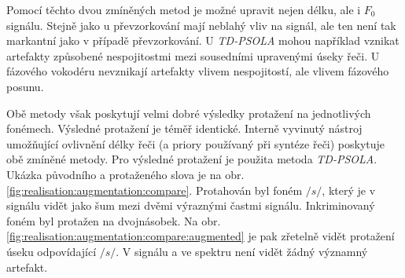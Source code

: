 Pomocí těchto dvou zmíněných metod je možné upravit nejen délku, ale i $F_0$ signálu. Stejně jako u převzorkování mají neblahý vliv na signál, ale ten není tak markantní jako v případě převzorkování. U \textit{TD-PSOLA} mohou například vznikat artefakty způsobené nespojitostmi mezi sousedními upravenými úseky řeči. U fázového vokodéru nevznikají artefakty vlivem nespojitostí, ale vlivem fázového posunu.


Obě metody však poskytují velmi dobré výsledky protažení na jednotlivých fonémech. Výsledné protažení je téměř identické. Interně vyvinutý nástroj umožňující ovlivnění délky řeči (a priory používaný při syntéze řeči) poskytuje obě zmíněné metody. Pro výsledné protažení je použita metoda \textit{TD-PSOLA}. Ukázka původního a protaženého slova  je na obr. \ref{fig:realisation:augmentation:compare}. Protahován byl foném $/s/$, který je v signálu vidět jako šum mezi dvěmi výraznými častmi signálu. Inkriminovaný foném byl protažen na dvojnásobek. Na obr. \ref{fig:realisation:augmentation:compare:augmented} je pak zřetelně vidět protažení úseku odpovídající $/s/$. V signálu a ve spektru není vidět žádný významný artefakt.

